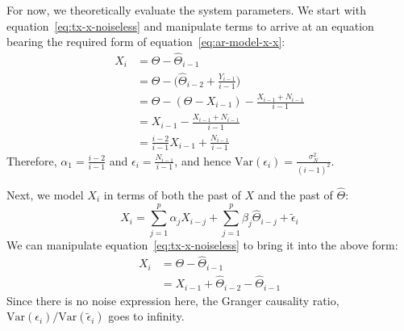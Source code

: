 \documentclass[letterpaper, 10pt, conference]{ieeeconf}
\begin{document}
For now, we theoretically evaluate the system parameters. We start with equation~\ref{eq:tx-x-noiseless} and manipulate terms to arrive at an equation bearing the required form of equation~\ref{eq:ar-model-x-x}:
\begin{align*}
	X_i &= \Theta - \widehat\Theta_{i-1} \\
		&= \Theta - \big( \widehat\Theta_{i-2} + \frac{Y_{i-1}}{i-1} \big) \\
		&= \Theta - (\Theta - X_{i-1}) - \frac{X_{i-1} + N_{i-1}}{i-1} \\
		&= X_{i-1} - \frac{X_{i-1} + N_{i-1}}{i-1} \\
		&= \frac{i-2}{i-1} X_{i-1} + \frac{N_{i-1}}{i-1}
\end{align*}
Therefore, $\alpha_1 = \frac{i-2}{i-1}$ and $\epsilon_i = \frac{N_{i-1}}{i-1}$, and hence $\text{Var}(\epsilon_i) = \frac{\sigma_N^2}{(i-1)^2}$.

Next, we model $X_i$ in terms of both the past of $X$ and the past of $\widehat\Theta$:
\begin{equation}
	X_i = \sum_{j=1}^{p}{\alpha_j X_{i-j}} + \sum_{j=1}^{p}{\beta_j \widehat\Theta_{i-j}} + \tilde\epsilon_i \label{eq:ar-model-x-x-theta}
\end{equation}
We can manipulate equation~\ref{eq:tx-x-noiseless} to bring it into the above form:
\begin{align*}
	X_i &= \Theta - \widehat\Theta_{i-1} \\
		&= X_{i-1} + \widehat\Theta_{i-2} - \widehat\Theta_{i-1}
\end{align*}
Since there is no noise expression here, the Granger causality ratio, $\text{Var}(\epsilon_i) / \text{Var}(\tilde\epsilon_i)$ goes to infinity.
\end{document}
